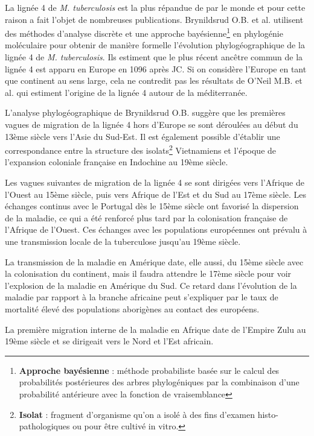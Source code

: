 \documentclass[twoside,a4paper,11pt,frenchb,openany]{report}
\begin{document}
La lignée 4 de \textit{M. tuberculosis} est la plus répandue de par le monde et pour cette raison a fait l'objet de nombreuses publications. Brynildsrud O.B. et al.\cite{brynildsrud} utilisent des méthodes d'analyse discrète et une approche bayésienne\footnote{\textbf{Approche bayésienne} : méthode probabiliste basée sur le calcul des probabilités postérieures des arbres phylogéniques par la combinaison d'une probabilité antérieure avec la fonction de vraisemblance} en phylogénie moléculaire pour obtenir de manière formelle l'évolution phylogéographique de la lignée 4 de \textit{M. tuberculosis}. Ils estiment que le plus récent ancêtre commun de la lignée 4 est apparu en Europe en 1096 après JC. Si on considère l'Europe en tant que continent au sens large, cela ne contredit pas les résultats de O'Neil M.B. et al.\cite{oneil} qui estiment l'origine de la lignée 4 autour de la méditerranée.


L'analyse phylogéographique de Brynildsrud O.B. suggère que les premières vagues de migration de la lignée 4 hors d'Europe se sont déroulées au début du 13ème siècle vers l'Asie du Sud-Est. Il est également possible d'établir une correspondance entre la structure des isolats\footnote{\textbf{Isolat} : fragment d'organisme qu'on a isolé à des fins d'examen histo-pathologiques ou pour être cultivé in vitro.} Vietnamiens et l'époque de l'expansion coloniale française en Indochine au 19ème siècle.

Les vagues suivantes de migration de la lignée 4 se sont dirigées vers l'Afrique de l'Ouest au 15ème siècle, puis vers Afrique de l'Est et du Sud au 17ème siècle. Les échanges continus avec le Portugal dès le 15ème siècle ont favorisé la dispersion de la maladie, ce qui a été renforcé plus tard par la colonisation française de l'Afrique de l'Ouest.  Ces échanges avec les populations européennes ont prévalu à une transmission locale de la tuberculose jusqu'au 19ème siècle. 

La transmission de la maladie en Amérique date, elle aussi, du 15ème siècle avec la colonisation du continent, mais il faudra attendre le 17ème siècle pour voir l'explosion de la maladie en Amérique du Sud. Ce retard dans l'évolution de la maladie par rapport à la branche africaine peut s'expliquer par le taux de mortalité élevé des populations aborigènes au contact des européens.

La première migration interne de la maladie en Afrique date de l'Empire Zulu au 19ème siècle et se dirigeait vers le Nord et l'Est africain.
\end{document}
